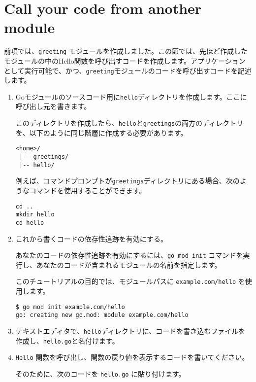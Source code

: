 \section{Call your code from another module}

前項では、\texttt{greeting} モジュールを作成しました。この節では、先ほど作成したモジュールの中のHello関数を呼び出すコードを作成します。アプリケーションとして実行可能で、かつ、\texttt{greeting}モジュールのコードを呼び出すコードを記述します。

\begin{enumerate}
\item Goモジュールのソースコード用に\texttt{hello}ディレクトリを作成します。ここに呼び出し元を書きます。

このディレクトリを作成したら、\texttt{hello}と\texttt{greetings}の両方のディレクトリを、以下のように同じ階層に作成する必要があります。

\begin{lstlisting}[numbers=none]
<home>/
 |-- greetings/
 |-- hello/
\end{lstlisting}

例えば、コマンドプロンプトが\texttt{greetings}ディレクトリにある場合、次のようなコマンドを使用することができます。

\begin{lstlisting}[numbers=none]
cd ..
mkdir hello
cd hello
\end{lstlisting}

\item これから書くコードの依存性追跡を有効にする。

あなたのコードの依存性追跡を有効にするには、\texttt{go mod init} コマンドを実行し、あなたのコードが含まれるモジュールの名前を指定します。

このチュートリアルの目的では、モジュールパスに \texttt{example.com/hello} を使用します。

\begin{lstlisting}[numbers=none]
$ go mod init example.com/hello
go: creating new go.mod: module example.com/hello
\end{lstlisting}


\item テキストエディタで、\texttt{hello}ディレクトリに、コードを書き込むファイルを作成し、\texttt{hello.go}と名付けます。

\item \texttt{Hello} 関数を呼び出し、関数の戻り値を表示するコードを書いてください。

そのために、次のコードを \texttt{hello.go} に貼り付けます。


\end{enumerate}

